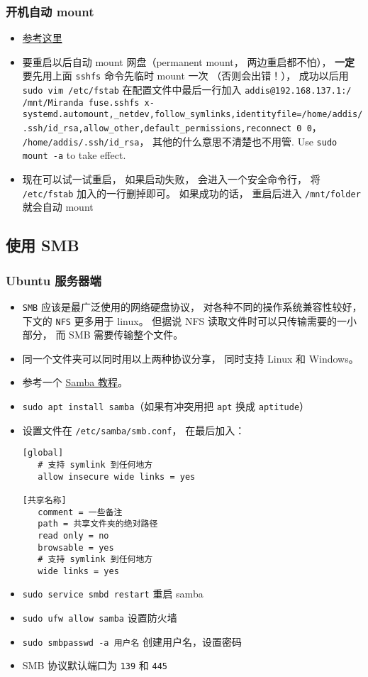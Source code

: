 \subsubsection{开机自动 mount}
\begin{itemize}
\item \href{https://www.linode.com/docs/networking/ssh/using-sshfs-on-linux/}{参考这里}
\item 要重启以后自动 mount 网盘（permanent mount， 两边重启都不怕）， \textbf{一定}要先用上面 \verb`sshfs` 命令先临时 mount 一次 （否则会出错！）， 成功以后用 \verb`sudo vim /etc/fstab` 在配置文件中最后一行加入 \verb`addis@192.168.137.1:/ /mnt/Miranda fuse.sshfs x-systemd.automount,_netdev,follow_symlinks,identityfile=/home/addis/.ssh/id_rsa,allow_other,default_permissions,reconnect 0 0`， \verb`/home/addis/.ssh/id_rsa`， 其他的什么意思不清楚也不用管. Use \verb`sudo mount -a` to take effect.
\item 现在可以试一试重启， 如果启动失败， 会进入一个安全命令行， 将 \verb`/etc/fstab` 加入的一行删掉即可。 如果成功的话， 重启后进入 \verb`/mnt/folder` 就会自动 mount
\end{itemize}

\subsection{使用 SMB}
\subsubsection{Ubuntu 服务器端}
\begin{itemize}
\item \verb|SMB| 应该是最广泛使用的网络硬盘协议， 对各种不同的操作系统兼容性较好， 下文的 \verb|NFS| 更多用于 linux。 但据说 NFS 读取文件时可以只传输需要的一小部分， 而 SMB 需要传输整个文件。
\item 同一个文件夹可以同时用以上两种协议分享， 同时支持 Linux 和 Windows。
\item 参考一个 \href{https://ubuntu.com/tutorials/install-and-configure-samba}{Samba 教程}。
\item \verb|sudo apt install samba|（如果有冲突用把 \verb|apt| 换成 \verb|aptitude|）
\item 设置文件在 \verb|/etc/samba/smb.conf|， 在最后加入：
\begin{lstlisting}[language=none]
[global]
   # 支持 symlink 到任何地方
   allow insecure wide links = yes

[共享名称]
   comment = 一些备注
   path = 共享文件夹的绝对路径
   read only = no
   browsable = yes
   # 支持 symlink 到任何地方
   wide links = yes
\end{lstlisting}
\item \verb|sudo service smbd restart| 重启 samba
\item \verb|sudo ufw allow samba| 设置防火墙
\item \verb|sudo smbpasswd -a 用户名| 创建用户名，设置密码
\item SMB 协议默认端口为 \verb|139| 和 \verb|445|
\end{itemize}

